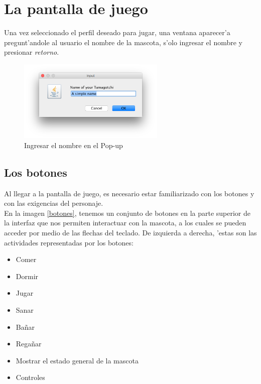 \documentclass[12pt]{amsart}
\begin{document}
\section{La pantalla de juego}
\hspace{10mm}Una vez seleccionado el perfil deseado para jugar, una ventana aparecer'a pregunt'andole al usuario el nombre de la mascota, s'olo ingresar el nombre y presionar \textit{retorno}.
\begin{figure}
	\includegraphics[width=7.0cm]{images/Name.jpg}
	\caption{Ingresar el nombre en el Pop-up}
	\label{name}
\end{figure}

\subsection{Los botones}
Al llegar a la pantalla de juego, es necesario estar familiarizado con los botones y con las exigencias del personaje.\\
En la imagen \ref{botones}, tenemos un conjunto de botones en la parte superior de la interfaz que nos permiten interactuar con la mascota, a los cuales se pueden acceder por medio de las flechas del teclado. De izquierda a derecha, 'estas son las actividades representadas por los botones:\\
\begin{itemize}
	\item Comer
	\item Dormir
	\item Jugar
	\item Sanar
	\item Ba\~nar
	\item Rega\~nar
	\item Mostrar el estado general de la mascota
	\item Controles
\end{itemize}
\end{document}
